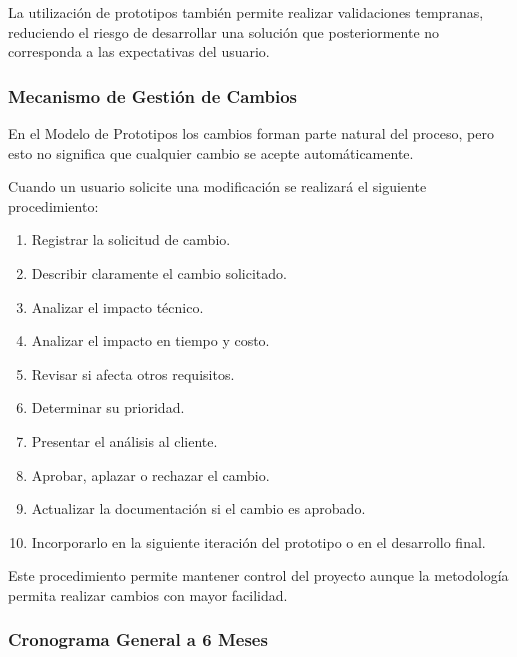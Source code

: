 \documentclass[pdflatex,sn-mathphys-num]{sn-jnl}%
\theoremstyle{thmstyleone}%
\theoremstyle{thmstyletwo}%
\theoremstyle{thmstylethree}%
\begin{document}
 La utilización de prototipos también permite realizar validaciones tempranas, reduciendo el riesgo de desarrollar una solución que posteriormente no corresponda a las expectativas del usuario.
 
 
 \subsubsection{Mecanismo de Gestión de Cambios}
 
 En el Modelo de Prototipos los cambios forman parte natural del proceso, pero esto no significa que cualquier cambio se acepte automáticamente.
 
 Cuando un usuario solicite una modificación se realizará el siguiente procedimiento:
 
 \begin{enumerate}
 	\item Registrar la solicitud de cambio.
 	\item Describir claramente el cambio solicitado.
 	\item Analizar el impacto técnico.
 	\item Analizar el impacto en tiempo y costo.
 	\item Revisar si afecta otros requisitos.
 	\item Determinar su prioridad.
 	\item Presentar el análisis al cliente.
 	\item Aprobar, aplazar o rechazar el cambio.
 	\item Actualizar la documentación si el cambio es aprobado.
 	\item Incorporarlo en la siguiente iteración del prototipo o en el desarrollo final.
 \end{enumerate}
 
 Este procedimiento permite mantener control del proyecto aunque la metodología permita realizar cambios con mayor facilidad.
 
 
 \subsubsection{Cronograma General a 6 Meses}
 
\end{document}
